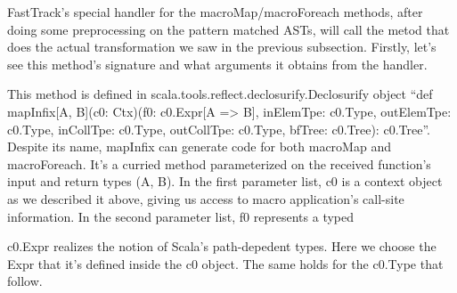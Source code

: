 FastTrack's special handler for the macroMap/macroForeach methods, after
doing some preprocessing on the pattern matched ASTs, will call the metod
that does the actual transformation we saw in the previous subsection. Firstly,
let's see this method's signature and what arguments it obtains
from the handler.

This method is defined in scala.tools.reflect.declosurify.Declosurify
object ``def mapInfix[A, B](c0: Ctx)(f0: c0.Expr[A => B], inElemTpe: c0.Type,
outElemTpe: c0.Type, inCollTpe: c0.Type, outCollTpe: c0.Type, bfTree: c0.Tree):
c0.Tree''. Despite its name, mapInfix can generate code for both macroMap and
macroForeach. It's a curried method parameterized on the received function's
input and return types (A, B). In the first parameter list, c0 is a context
object as we described it above, giving us access to macro application's
call-site information. In the second parameter list, f0 represents a typed 

c0.Expr realizes the notion of Scala's path-depedent types. Here we  choose the
Expr that it's defined inside the c0 object. The same holds for the c0.Type
that follow.